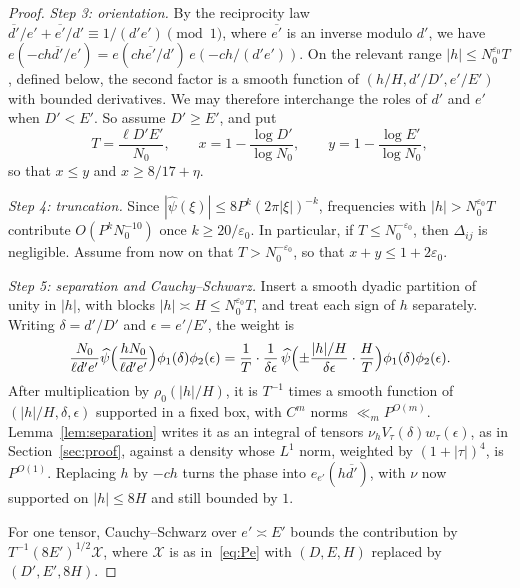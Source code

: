 \documentclass[11pt]{amsart}
\theoremstyle{definition}
\theoremstyle{remark}
\numberwithin{equation}{section}
\newcommand{\cX}{\mathcal X}
\newcommand{\eps}{\varepsilon}
\newcommand{\inv}[1]{\overline{#1}}
\begin{document}
\begin{proof}
\emph{Step 3: orientation.}  By the reciprocity law
$\inv{d'}/e'+\inv{e'}/d'\equiv1/(d'e')\pmod 1$, where $\inv{e'}$ is an
inverse modulo $d'$, we have
$e(-ch\inv{d'}/e')=e(ch\inv{e'}/d')\,e(-ch/(d'e'))$.  On the relevant range
$|h|\le N_0^{\eps_0}T$, defined below, the second factor is a smooth
function of $(h/H,d'/D',e'/E')$ with bounded derivatives.  We may therefore
interchange the roles of $d'$ and $e'$ when $D'<E'$.  So assume $D'\ge E'$,
and put
\[
 T=\frac{\ell D'E'}{N_0},\qquad
 x=1-\frac{\log D'}{\log N_0},\qquad
 y=1-\frac{\log E'}{\log N_0},
\]
so that $x\le y$ and $x\ge8/17+\eta$.

\emph{Step 4: truncation.}  Since $|\widehat\psi(\xi)|\le8P^k(2\pi|\xi|)^{-k}$,
frequencies with $|h|>N_0^{\eps_0}T$ contribute $O(P^kN_0^{-10})$ once
$k\ge20/\eps_0$.  In particular, if $T\le N_0^{-\eps_0}$, then $\Delta_{ij}$
is negligible.  Assume from now on that $T>N_0^{-\eps_0}$, so that
$x+y\le1+2\eps_0$.

\emph{Step 5: separation and Cauchy--Schwarz.}  Insert a smooth dyadic
partition of unity in $|h|$, with blocks $|h|\asymp H\le N_0^{\eps_0}T$,
and treat each sign of $h$ separately.  Writing $\delta=d'/D'$ and
$\epsilon=e'/E'$, the weight is
\[
 \frac{N_0}{\ell d'e'}\widehat\psi\Bigl(\frac{hN_0}{\ell d'e'}\Bigr)
 \phi_1(\delta)\phi_2(\epsilon)
 =\frac1T\cdot\frac{1}{\delta\epsilon}\,
 \widehat\psi\Bigl(\pm\frac{|h|/H}{\delta\epsilon}\cdot\frac HT\Bigr)
 \phi_1(\delta)\phi_2(\epsilon).
\]
After multiplication by $\rho_0(|h|/H)$, it is $T^{-1}$ times a smooth
function of $(|h|/H,\delta,\epsilon)$ supported in a fixed box, with $C^m$
norms $\ll_m P^{O(m)}$.  Lemma~\ref{lem:separation} writes it as an integral
of tensors $\nu_h V_\tau(\delta)w_\tau(\epsilon)$, as in
Section~\ref{sec:proof}, against a density whose $L^1$ norm, weighted by
$(1+|\tau|)^4$, is $P^{O(1)}$.  Replacing $h$ by $-ch$ turns the phase into
$e_{e'}(h\inv{d'})$, with $\nu$ now supported on $|h|\le8H$ and still bounded
by $1$.

For one tensor, Cauchy--Schwarz over $e'\asymp E'$ bounds the contribution
by $T^{-1}(8E')^{1/2}\cX$, where $\cX$ is as in~\eqref{eq:Pe} with
$(D,E,H)$ replaced by $(D',E',8H)$.


\end{proof}
\end{document}
